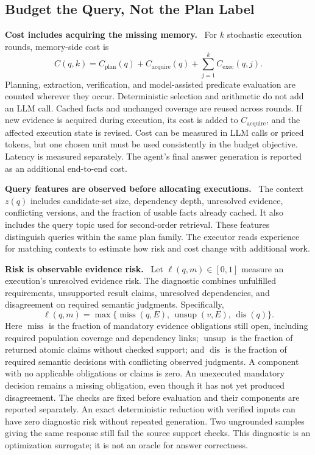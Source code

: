 \documentclass[10pt,twocolumn]{article}
\newcommand{\runin}[1]{\smallskip\noindent\textbf{#1.}\ }
\begin{document}
\subsection{Budget the Query, Not the Plan Label}
\label{subsec:new-budget}

\runin{Cost includes acquiring the missing memory}
For $k$ stochastic execution rounds, memory-side cost is
\begin{equation}
\label{eq:new-cost}
C(q,k)=C_{\mathrm{plan}}(q)+C_{\mathrm{acquire}}(q)
              +\sum_{j=1}^{k}C_{\mathrm{exec}}(q,j).
\end{equation}
Planning, extraction, verification, and model-assisted predicate
evaluation are counted wherever they occur. Deterministic selection
and arithmetic do not add an LLM call. Cached facts and unchanged
coverage are reused across rounds. If new evidence is acquired during
execution, its cost is added to $C_{\mathrm{acquire}}$, and the affected
execution state is revised. Cost can be measured in LLM calls or
priced tokens, but one chosen unit must be used consistently in the
budget objective. Latency is measured separately. The agent's final
answer generation is reported as an additional end-to-end cost.

\runin{Query features are observed before allocating executions}
The context $z(q)$ includes candidate-set size, dependency depth,
unresolved evidence, conflicting versions, and the fraction of usable
facts already cached. It also includes the query topic used for
second-order retrieval. These features distinguish queries within
the same plan family. The executor reads experience for matching
contexts to estimate how risk and cost change with additional work.

\runin{Risk is observable evidence risk}
Let $\ell(q,m)\in[0,1]$ measure an execution's unresolved evidence risk.
The diagnostic combines unfulfilled requirements, unsupported result
claims, unresolved dependencies, and disagreement on required semantic
judgments. Specifically,
\begin{equation}
\label{eq:new-risk}
\ell(q,m)=\max\{\operatorname{miss}(q,E),\,
  \operatorname{unsup}(v,E),\,\operatorname{dis}(q)\}.
\end{equation}
Here $\operatorname{miss}$ is the fraction of mandatory evidence
obligations still open, including required population coverage and
dependency links; $\operatorname{unsup}$ is the fraction of returned
atomic claims without checked support; and $\operatorname{dis}$ is the
fraction of required semantic decisions with conflicting observed
judgments. A component with no applicable obligations or claims is
zero. An unexecuted mandatory decision remains a missing obligation,
even though it has not yet produced disagreement. The checks are fixed
before evaluation and their components are reported separately.
An exact deterministic reduction with verified
inputs can have zero diagnostic risk without repeated generation.
Two ungrounded samples giving the same response still fail the source
support checks. This diagnostic is an optimization surrogate; it is
not an oracle for answer correctness.
\end{document}
